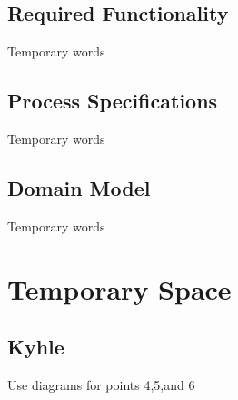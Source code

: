 \documentclass[11pt]{article}
\begin{document}
\subsection{Required Functionality}
Temporary words
\subsection{Process Specifications}
Temporary words
\subsection{Domain Model}
Temporary words

\newpage
\section{Temporary Space}
\subsection{Kyhle}
Use diagrams for points 4,5,and 6
\end{document}
